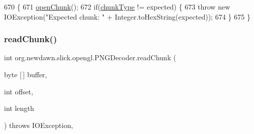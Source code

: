 \begin{DoxyCode}
670                                                             \{
671         \mbox{\hyperlink{classorg_1_1newdawn_1_1slick_1_1opengl_1_1_p_n_g_decoder_afa7ad43df0de182a0fd27c9f6ca52e3d}{openChunk}}();
672         \textcolor{keywordflow}{if}(\mbox{\hyperlink{classorg_1_1newdawn_1_1slick_1_1opengl_1_1_p_n_g_decoder_a7d32000e77c9c28ad7751acf96da46ec}{chunkType}} != expected) \{
673             \textcolor{keywordflow}{throw} \textcolor{keyword}{new} IOException(\textcolor{stringliteral}{"Expected chunk: "} + Integer.toHexString(expected));
674         \}
675     \}
\end{DoxyCode}
\mbox{\label{classorg_1_1newdawn_1_1slick_1_1opengl_1_1_p_n_g_decoder_ae2014f14734121c02f976b1fe4733c2d}} 
\subsubsection{\texorpdfstring{read\+Chunk()}{readChunk()}}
{\footnotesize\ttfamily int org.\+newdawn.\+slick.\+opengl.\+P\+N\+G\+Decoder.\+read\+Chunk (\begin{DoxyParamCaption}\item[{byte \mbox{[}$\,$\mbox{]}}]{buffer,  }\item[{int}]{offset,  }\item[{int}]{length }\end{DoxyParamCaption}) throws I\+O\+Exception\hspace{0.3cm}{\ttfamily [inline]}, {\ttfamily [private]}}


